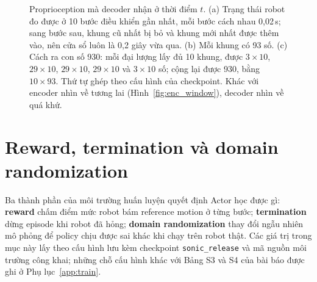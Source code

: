 \documentclass[12pt,a4paper,oneside]{report}
\newcommand{\code}[1]{\texttt{#1}}
\begin{document}
\begin{figure}[htbp]
\caption[Proprioception mà decoder nhận ở thời điểm $t$]{Proprioception mà decoder nhận ở thời điểm $t$. (a) Trạng thái robot đo được ở 10 bước điều khiển gần nhất, mỗi bước cách nhau 0,02\,s; sang bước sau, khung cũ nhất bị bỏ và khung mới nhất được thêm vào, nên cửa sổ luôn là 0,2 giây vừa qua. (b) Mỗi khung có 93 số. (c) Cách ra con số 930: mỗi đại lượng lấy đủ 10 khung, được $3 \times 10$, $29 \times 10$, $29 \times 10$, $29 \times 10$ và $3 \times 10$ số; cộng lại được 930, bằng $10 \times 93$. Thứ tự ghép theo cấu hình của checkpoint. Khác với encoder nhìn về tương lai (Hình~\ref{fig:enc_window}), decoder nhìn về quá khứ.}
\label{fig:prop_window}
\end{figure}

\section{Reward, termination và domain randomization}
\label{sec:reward}

Ba thành phần của môi trường huấn luyện quyết định Actor học được gì: \textbf{reward} chấm điểm mức robot bám reference motion ở từng bước; \textbf{termination} dừng episode khi robot đã hỏng; \textbf{domain randomization} thay đổi ngẫu nhiên mô phỏng để policy chịu được sai khác khi chạy trên robot thật. Các giá trị trong mục này lấy theo cấu hình lưu kèm checkpoint \code{sonic\_release} và mã nguồn môi trường công khai; những chỗ cấu hình khác với Bảng S3 và S4 của bài báo được ghi ở Phụ lục~\ref{app:train}.
\end{document}
